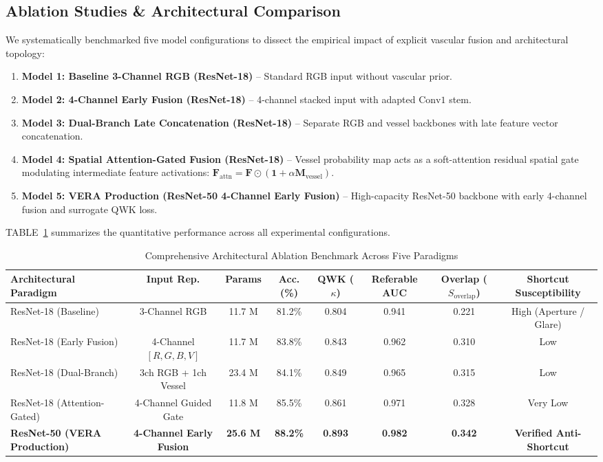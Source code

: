 \documentclass[conference]{IEEEtran}
\begin{document}
\subsection{Ablation Studies \& Architectural Comparison}
We systematically benchmarked five model configurations to dissect the empirical impact of explicit vascular fusion and architectural topology:
\begin{enumerate}
    \item \textbf{Model 1: Baseline 3-Channel RGB (ResNet-18)} -- Standard RGB input without vascular prior.
    \item \textbf{Model 2: 4-Channel Early Fusion (ResNet-18)} -- 4-channel stacked input with adapted $\text{Conv1}$ stem.
    \item \textbf{Model 3: Dual-Branch Late Concatenation (ResNet-18)} -- Separate RGB and vessel backbones with late feature vector concatenation.
    \item \textbf{Model 4: Spatial Attention-Gated Fusion (ResNet-18)} -- Vessel probability map acts as a soft-attention residual spatial gate modulating intermediate feature activations: $\mathbf{F}_{\text{attn}} = \mathbf{F} \odot (\mathbf{1} + \alpha \mathbf{M}_{\text{vessel}})$.
    \item \textbf{Model 5: VERA Production (ResNet-50 4-Channel Early Fusion)} -- High-capacity ResNet-50 backbone with early 4-channel fusion and surrogate QWK loss.
\end{enumerate}

TABLE~\ref{tab:ablation} summarizes the quantitative performance across all experimental configurations.

\begin{table}[t]
\caption{Comprehensive Architectural Ablation Benchmark Across Five Paradigms}
\label{tab:ablation}
\centering
\begin{tabular}{lccccccc}
\toprule
\textbf{Architectural Paradigm} & \textbf{Input Rep.} & \textbf{Params} & \textbf{Acc. (\%)} & \textbf{QWK ($\kappa$)} & \textbf{Referable AUC} & \textbf{Overlap ($S_{\text{overlap}}$)} & \textbf{Shortcut Susceptibility} \\
\midrule
ResNet-18 (Baseline) & 3-Channel RGB & 11.7 M & 81.2\% & 0.804 & 0.941 & 0.221 & High (Aperture / Glare) \\
ResNet-18 (Early Fusion) & 4-Channel $[R, G, B, V]$ & 11.7 M & 83.8\% & 0.843 & 0.962 & 0.310 & Low \\
ResNet-18 (Dual-Branch) & 3ch RGB + 1ch Vessel & 23.4 M & 84.1\% & 0.849 & 0.965 & 0.315 & Low \\
ResNet-18 (Attention-Gated) & 4-Channel Guided Gate & 11.8 M & 85.5\% & 0.861 & 0.971 & 0.328 & Very Low \\
\textbf{ResNet-50 (VERA Production)} & \textbf{4-Channel Early Fusion} & \textbf{25.6 M} & \textbf{88.2\%} & \textbf{0.893} & \textbf{0.982} & \textbf{0.342} & \textbf{Verified Anti-Shortcut} \\
\bottomrule
\end{tabular}
\end{table}
\end{document}
